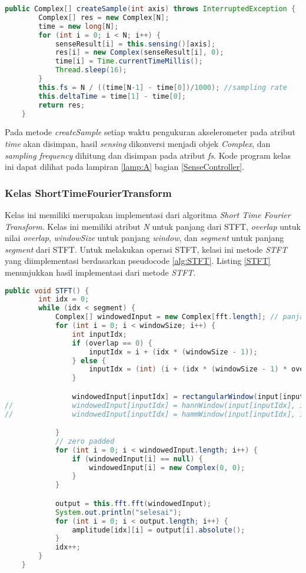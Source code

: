 \begin{lstlisting}[label=createSample, language=Java, caption=Metode createSample(), numbers=none]
    public Complex[] createSample(int axis) throws InterruptedException {
		Complex[] res = new Complex[N];
		time = new long[N];
		for (int i = 0; i < N; i++) {
			senseResult[i] = this.sensing()[axis];			
			res[i] = new Complex(senseResult[i], 0);
			time[i] = Time.currentTimeMillis();
			Thread.sleep(16);
		}
		this.fs = N / ((time[N-1] - time[0])/1000); //sampling rate
		this.deltaTime = time[1] - time[0];
		return res;
	}
\end{lstlisting}

Pada metode {\it createSample} setiap waktu pengukuran akselerometer pada atribut {\it time} akan disimpan, hasil {\it sensing} dikonversi menjadi objek {\it Complex}, dan {\it sampling frequency} dihitung dan disimpan pada atribut {\it fs}. Kode program kelas ini dapat dilihat pada lampiran \ref{lamp:A} bagian \ref{SenseController}.

\subsubsection{Kelas ShortTimeFourierTransform}
Kelas ini memiliki merupakan implementasi dari algoritma {\it Short Time Fourier Transform}. Kelas ini memiliki atribut {\it N} untuk panjang dari STFT, {\it overlap} untuk nilai {\it overlap}, {\it windowSize} untuk panjang {\it window}, dan {\it segment} untuk panjang {\it segment} dari STFT. Untuk melakukan operasi STFT, kelasi ini metode {\it STFT} yang diimplementasi berdasarkan pseudocode \ref{alg:STFT}. Listing \ref{STFT} menunjukkan hasil implementasi dari metode {\it STFT}.

\begin{lstlisting}[label=STFT, language=Java, caption=Metode STFT(), numbers=none]
    public void STFT() {
		int idx = 0;
		while (idx < segment) {
			Complex[] windowedInput = new Complex[fft.length]; // panjang arr window sama dengan fft
			for (int i = 0; i < windowSize; i++) {
				int inputIdx;
				if (overlap == 0) {
					inputIdx = i + (idx * (windowSize - 1));
				} else {
					inputIdx = (int) (i + (idx * (windowSize - 1) * overlap));
				}

				windowedInput[inputIdx] = rectangularWindow(input[inputIdx]);
//				windowedInput[inputIdx] = hannWindow(input[inputIdx], i);
//				windowedInput[inputIdx] = hammWindow(input[inputIdx], i);

			}
			// zero padded
			for (int i = 0; i < windowedInput.length; i++) {
				if (windowedInput[i] == null) {
					windowedInput[i] = new Complex(0, 0);
				}
			}

			output = this.fft.fft(windowedInput);
			System.out.println("selesai");
			for (int i = 0; i < output.length; i++) {
				amplitude[idx][i] = output[i].absolute();
			}
			idx++;
		}
	}
\end{lstlisting}

